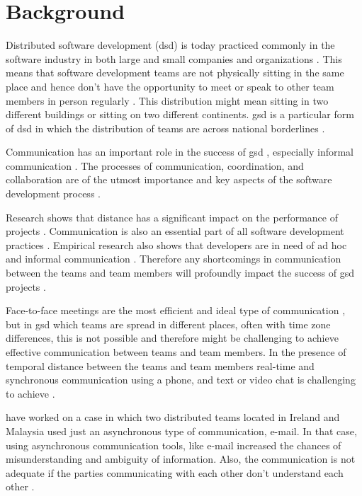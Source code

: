 \chapter{Background}
Distributed software development (\ac{dsd}) is today practiced commonly in the software industry in both large and small companies and organizations \citep{shrivastava2010distributed}. This means that software development teams are not physically sitting in the same place and hence don’t have the opportunity to meet or speak to other team members in person regularly \citep{layman2006essential}. This distribution might mean sitting in two different buildings or sitting on two different continents. \ac{gsd} is a particular form of \ac{dsd} in which the distribution of teams are across national borderlines \citep{sahay2003global}. 

Communication has an important role in the success of \ac{gsd} \citep{carmel2001tactical,french1998study}, especially informal communication \citep{herbsleb2003empirical}. The processes of communication, coordination, and collaboration are of the utmost importance and key aspects of the software development process \citep{colomo2014agile}. 

Research shows that distance has a significant impact on the performance of projects \citep{damian2003global,Herbsleb2001a}. Communication is also an essential part of all software development practices \citep{layman2006essential}. Empirical research also shows that developers are in need of ad hoc and informal communication \citep{grinter1998recomposition,kraut1995coordination}. Therefore any shortcomings in communication between the teams and team members will profoundly impact the success of \ac{gsd} projects \citep{layman2006essential}.

Face-to-face meetings are the most efficient and ideal type of communication \citep{Kirkman2004}, but in \ac{gsd} which teams are spread in different places, often with time zone differences, this is not possible and therefore might be challenging to achieve effective communication between teams and team members. In the presence of temporal distance between the teams and team members real-time and synchronous communication using a phone, and text or video chat is challenging to achieve \citep{holmstrom2006agile,kommeren2007philips}.

\citet{casey2008impact} have worked on a case in which two distributed teams located in Ireland and Malaysia used just an asynchronous type of communication, e-mail. In that case, using asynchronous communication tools, like e-mail increased the chances of misunderstanding and ambiguity of information. Also, the communication is not adequate if the parties communicating with each other don’t understand each other \citep{kommeren2007philips,cataldo2007coordination}.

